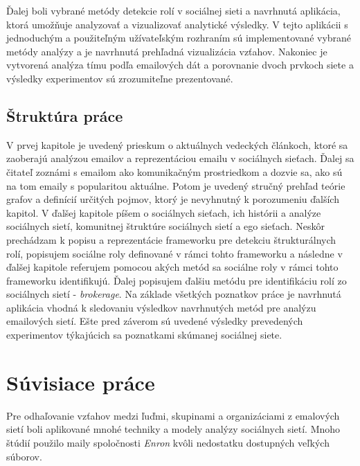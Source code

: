 \documentclass[slovak,master,public,dept460,male,cpdeclaration,oneside]{diploma}
\begin{document}
Ďalej boli vybrané metódy detekcie rolí v sociálnej sieti a navrhnutá aplikácia, ktorá umožňuje analyzovať a vizualizovať analytické výsledky. V tejto aplikácii s jednoduchým a použiteľným užívateľským rozhraním sú implementované vybrané metódy analýzy a je navrhnutá prehľadná vizualizácia vzťahov. Nakoniec je vytvorená analýza tímu podľa emailových dát a porovnanie dvoch prvkoch siete a výsledky experimentov sú zrozumiteľne prezentované.

\subsection{Štruktúra práce}
V prvej kapitole je uvedený prieskum o aktuálnych vedeckých článkoch, ktoré sa zaoberajú analýzou emailov a reprezentáciou emailu v sociálnych sieťach. Ďalej sa čitateľ zoznámi s emailom ako komunikačným prostriedkom a dozvie sa, ako sú na tom emaily s popularitou aktuálne. Potom je uvedený stručný prehľad teórie grafov a definícií určitých pojmov, ktorý je nevyhnutný k porozumeniu ďalších kapitol. V ďalšej kapitole píšem o sociálnych sieťach, ich histórii a analýze sociálnych sietí, komunitnej štruktúre sociálnych sietí a ego sieťach. Neskôr prechádzam k popisu a reprezentácie frameworku pre detekciu štrukturálnych rolí, popisujem sociálne roly definované v rámci tohto frameworku a následne v ďalšej kapitole referujem pomocou akých metód sa sociálne roly v rámci tohto frameworku identifikujú. Ďalej popisujem ďalšiu metódu pre identifikáciu rolí zo sociálnych sietí - \textit{brokerage}. Na základe všetkých poznatkov práce je navrhnutá aplikácia vhodná k sledovaniu výsledkov navrhnutých metód pre analýzu emailových sietí.  Ešte pred záverom sú uvedené výsledky prevedených experimentov týkajúcich sa poznatkami skúmanej sociálnej siete.


\section{Súvisiace práce}

Pre odhaľovanie vzťahov medzi ľuďmi, skupinami a organizáciami z emalových sietí boli aplikované mnohé techniky a modely analýzy sociálnych sietí. Mnoho štúdií použilo maily spoločnosti \textit{Enron} kvôli nedostatku dostupných veľkých súborov. 
\end{document}
